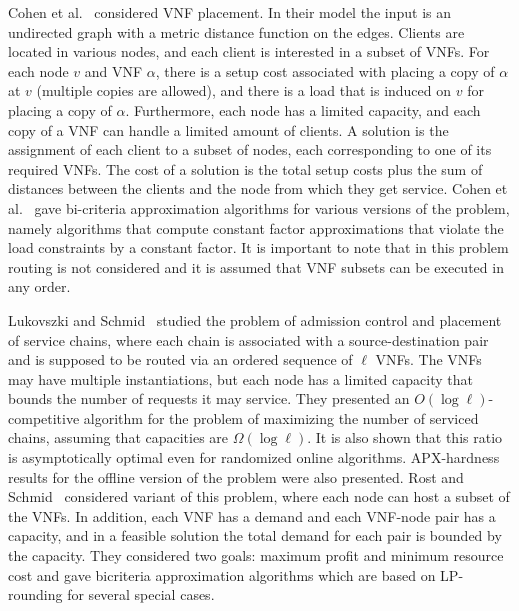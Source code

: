 \documentclass[runningheads]{llncs}
\begin{document}
Cohen et al.~\cite{CLNR15} considered VNF placement.  In their model
the input is an undirected graph with a metric distance function on
the edges.  Clients are located in various nodes, and each client is
interested in a subset of VNFs.  For each node $v$ and VNF $\alpha$,
there is a setup cost associated with placing a copy of $\alpha$ at
$v$ (multiple copies are allowed), and there is a load that is induced
on $v$ for placing a copy of $\alpha$.  Furthermore, each node has a
limited capacity, and each copy of a VNF can handle a limited amount
of clients.  A solution is the assignment of each client to a subset
of nodes, each corresponding to one of its required VNFs.  The cost of
a solution is the total setup costs plus the sum of distances between
the clients and the node from which they get service.
%
Cohen et al.~\cite{CLNR15} gave bi-criteria approximation algorithms
for various versions of the problem, namely algorithms that compute
constant factor approximations that violate the load constraints by a
constant factor.
%
It is important to note that in this problem routing is not considered
and it is assumed that VNF subsets can be executed in any order.

Lukovszki and Schmid~\cite{LukovszkiSchmid15} studied the problem of
admission control and placement of service chains, where each chain is
associated with a source-destination pair and is supposed to be routed
via an ordered sequence of $\ell$ VNFs.  The VNFs may have multiple
instantiations, but each node has a limited capacity that bounds the
number of requests it may service.
%
They presented an $O(\log \ell)$-competitive algorithm for the problem
of maximizing the number of serviced chains, assuming that capacities
are $\Omega(\log \ell)$.
It is also shown that this ratio is asymptotically optimal even for
randomized online algorithms.  APX-hardness results for the offline
version of the problem were also presented.
%
Rost and Schmid~\cite{RostSchmid16} considered variant of this
problem, where each node can host a subset of the VNFs.  In addition,
each VNF has a demand and each VNF-node pair has a capacity, and in a
feasible solution the total demand for each pair is bounded by the
capacity.  They considered two goals: maximum profit and minimum
resource cost and gave bicriteria approximation algorithms which are
based on LP-rounding for several special cases.
\end{document}
